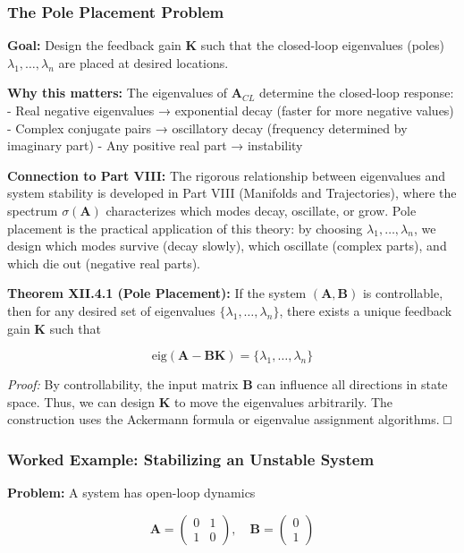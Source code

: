\documentclass[
]{article}
\begin{document}
\subsubsection{The Pole Placement
Problem}\label{the-pole-placement-problem}

\textbf{Goal:} Design the feedback gain \(\mathbf{K}\) such that the
closed-loop eigenvalues (poles) \(\lambda_1, \ldots, \lambda_n\) are
placed at desired locations.

\textbf{Why this matters:} The eigenvalues of \(\mathbf{A}_{CL}\)
determine the closed-loop response: - Real negative eigenvalues →
exponential decay (faster for more negative values) - Complex conjugate
pairs → oscillatory decay (frequency determined by imaginary part) - Any
positive real part → instability

\textbf{Connection to Part VIII:} The rigorous relationship between
eigenvalues and system stability is developed in Part VIII (Manifolds
and Trajectories), where the spectrum \(\sigma(\mathbf{A})\)
characterizes which modes decay, oscillate, or grow. Pole placement is
the practical application of this theory: by choosing
\(\lambda_1, \ldots, \lambda_n\), we design which modes survive (decay
slowly), which oscillate (complex parts), and which die out (negative
real parts).

\textbf{Theorem XII.4.1 (Pole Placement):} If the system
\((\mathbf{A}, \mathbf{B})\) is controllable, then for any desired set
of eigenvalues \(\{\lambda_1, \ldots, \lambda_n\}\), there exists a
unique feedback gain \(\mathbf{K}\) such that

\[\text{eig}(\mathbf{A} - \mathbf{BK}) = \{\lambda_1, \ldots, \lambda_n\}\]

\emph{Proof:} By controllability, the input matrix \(\mathbf{B}\) can
influence all directions in state space. Thus, we can design
\(\mathbf{K}\) to move the eigenvalues arbitrarily. The construction
uses the Ackermann formula or eigenvalue assignment algorithms. □

\subsubsection{Worked Example: Stabilizing an Unstable
System}\label{worked-example-stabilizing-an-unstable-system}

\textbf{Problem:} A system has open-loop dynamics

\[\mathbf{A} = \begin{pmatrix} 0 & 1 \\ 1 & 0 \end{pmatrix}, \quad \mathbf{B} = \begin{pmatrix} 0 \\ 1 \end{pmatrix}\]
\end{document}
